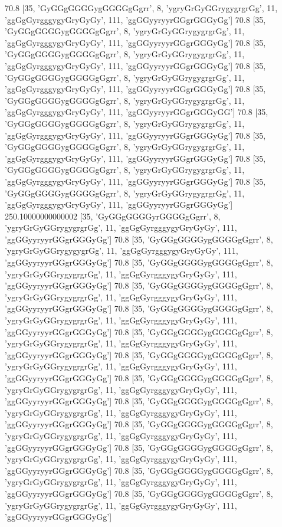 70.8 [35, 'GyGGgGGGGygGGGGgGgrr', 8, 'ygryGrGyGGrygygrgrGg', 11, 'ggGgGyrgggygyGryGyGy', 111, 'ggGGyyryyrGGgrGGGyGg']
70.8 [35, 'GyGGgGGGGygGGGGgGgrr', 8, 'ygryGrGyGGrygygrgrGg', 11, 'ggGgGyrgggygyGryGyGy', 111, 'ggGGyyryyrGGgrGGGyGg']
70.8 [35, 'GyGGgGGGGygGGGGgGgrr', 8, 'ygryGrGyGGrygygrgrGg', 11, 'ggGgGyrgggygyGryGyGy', 111, 'ggGGyyryyrGGgrGGGyGg']
70.8 [35, 'GyGGgGGGGygGGGGgGgrr', 8, 'ygryGrGyGGrygygrgrGg', 11, 'ggGgGyrgggygyGryGyGy', 111, 'ggGGyyryyrGGgrGGGyGg']
70.8 [35, 'GyGGgGGGGygGGGGgGgrr', 8, 'ygryGrGyGGrygygrgrGg', 11, 'ggGgGyrgggygyGryGyGy', 111, 'ggGGyyryyrGGgrGGGyGG']
70.8 [35, 'GyGGgGGGGygGGGGgGgrr', 8, 'ygryGrGyGGrygygrgrGg', 11, 'ggGgGyrgggygyGryGyGy', 111, 'ggGGyyryyrGGgrGGGyGg']
70.8 [35, 'GyGGgGGGGygGGGGgGgrr', 8, 'ygryGrGyGGrygygrgrGg', 11, 'ggGgGyrgggygyGryGyGy', 111, 'ggGGyyryyrGGgrGGGyGg']
70.8 [35, 'GyGGgGGGGygGGGGgGgrr', 8, 'ygryGrGyGGrygygrgrGg', 11, 'ggGgGyrgggygyGryGyGy', 111, 'ggGGyyryyrGGgrGGGyGg']
70.8 [35, 'GyGGgGGGGygGGGGgGgrr', 8, 'ygryGrGyGGrygygrgrGg', 11, 'ggGgGyrgggygyGryGyGy', 111, 'ggGGyyryyrGGgrGGGyGg']
250.10000000000002 [35, 'GyGGgGGGGyrGGGGgGgrr', 8, 'ygryGrGyGGrygygrgrGg', 11, 'ggGgGyrgggygyGryGyGy', 111, 'ggGGyyryyrGGgrGGGyGg']
70.8 [35, 'GyGGgGGGGygGGGGgGgrr', 8, 'ygryGrGyGGrygygygrGg', 11, 'ggGgGyrgggygyGryGyGy', 111, 'ggGGyyryyrGGgrGGGyGg']
70.8 [35, 'GyGGgGGGGygGGGGgGgrr', 8, 'ygryGrGyGGrygygrgrGg', 11, 'ggGgGyrgggygyGryGyGy', 111, 'ggGGyyryyrGGgrGGGyGg']
70.8 [35, 'GyGGgGGGGygGGGGgGgrr', 8, 'ygryGrGyGGrygygrgrGg', 11, 'ggGgGyrgggygyGryGyGy', 111, 'ggGGyyryyrGGgrGGGyGg']
70.8 [35, 'GyGGgGGGGygGGGGgGgrr', 8, 'ygryGrGyGGrygygrgrGg', 11, 'ggGgGyrgggygyGryGyGy', 111, 'ggGGyyryyrGGgrGGGyGg']
70.8 [35, 'GyGGgGGGGygGGGGgGgrr', 8, 'ygryGrGyGGrygygrgrGg', 11, 'ggGgGyrgggygyGryGyGy', 111, 'ggGGyyryyrGGgrGGGyGg']
70.8 [35, 'GyGGgGGGGygGGGGgGgrr', 8, 'ygryGrGyGGrygygrgrGg', 11, 'ggGgGyrgggygyGryGyGy', 111, 'ggGGyyryyrGGgrGGGyGg']
70.8 [35, 'GyGGgGGGGygGGGGgGgrr', 8, 'ygryGrGyGGrygygrgrGg', 11, 'ggGgGyrgggygyGryGyGy', 111, 'ggGGyyryyrGGgrGGGyGg']
70.8 [35, 'GyGGgGGGGygGGGGgGgrr', 8, 'ygryGrGyGGrygygrgrGg', 11, 'ggGgGyrgggygyGryGyGy', 111, 'ggGGyyryyrGGgrGGGyGg']
70.8 [35, 'GyGGgGGGGygGGGGgGgrr', 8, 'ygryGrGyGGrygygrgrGg', 11, 'ggGgGyrgggygyGryGyGy', 111, 'ggGGyyryyrGGgrGGGyGg']
70.8 [35, 'GyGGgGGGGygGGGGgGgrr', 8, 'ygryGrGyGGrygygrgrGg', 11, 'ggGgGyrgggygyGryGyGy', 111, 'ggGGyyryyrGGgrGGGyGg']
70.8 [35, 'GyGGgGGGGygGGGGgGgrr', 8, 'ygryGrGyGGrygygrgrGg', 11, 'ggGgGyrgggygyGryGyGy', 111, 'ggGGyyryyrGGgrGGGyGg']
70.8 [35, 'GyGGgGGGGygGGGGgGgrr', 8, 'ygryGrGyGGrygygrgrGg', 11, 'ggGgGyrgggygyGryGyGy', 111, 'ggGGyyryyrGGgrGGGyGg']
